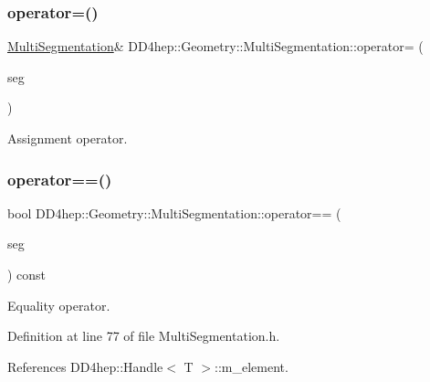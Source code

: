 \subsubsection{\texorpdfstring{operator=()}{operator=()}}
{\footnotesize\ttfamily \hyperlink{class_d_d4hep_1_1_geometry_1_1_multi_segmentation}{Multi\+Segmentation}\& D\+D4hep\+::\+Geometry\+::\+Multi\+Segmentation\+::operator= (\begin{DoxyParamCaption}\item[{const \hyperlink{class_d_d4hep_1_1_geometry_1_1_multi_segmentation}{Multi\+Segmentation} \&}]{seg }\end{DoxyParamCaption})\hspace{0.3cm}{\ttfamily [default]}}



Assignment operator. 

\hypertarget{class_d_d4hep_1_1_geometry_1_1_multi_segmentation_a316d28a62502365533defed5a686091e}{}\label{class_d_d4hep_1_1_geometry_1_1_multi_segmentation_a316d28a62502365533defed5a686091e} 
\subsubsection{\texorpdfstring{operator==()}{operator==()}}
{\footnotesize\ttfamily bool D\+D4hep\+::\+Geometry\+::\+Multi\+Segmentation\+::operator== (\begin{DoxyParamCaption}\item[{const \hyperlink{class_d_d4hep_1_1_geometry_1_1_multi_segmentation}{Multi\+Segmentation} \&}]{seg }\end{DoxyParamCaption}) const\hspace{0.3cm}{\ttfamily [inline]}}



Equality operator. 



Definition at line 77 of file Multi\+Segmentation.\+h.



References D\+D4hep\+::\+Handle$<$ T $>$\+::m\+\_\+element.

\hypertarget{class_d_d4hep_1_1_geometry_1_1_multi_segmentation_a4876e40635f9504329070cd252a1e9a2}{}\label{class_d_d4hep_1_1_geometry_1_1_multi_segmentation_a4876e40635f9504329070cd252a1e9a2} 
